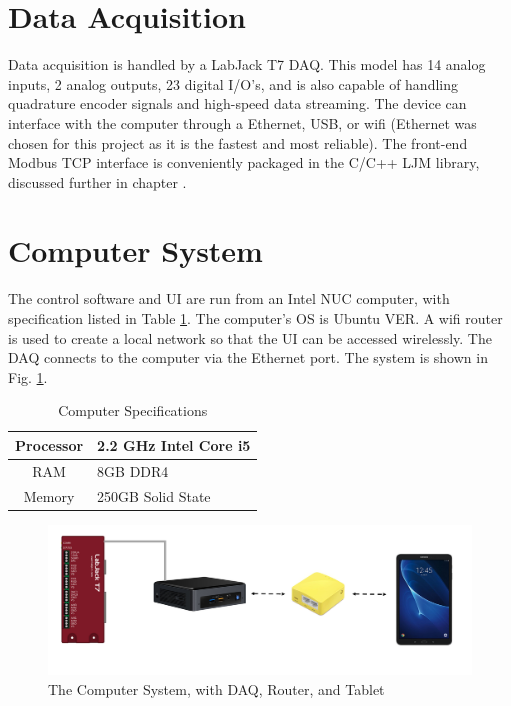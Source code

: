 \documentclass[12pt]{report}
\begin{document}
	
	\section{Data Acquisition} 

	Data acquisition is handled by a LabJack T7 DAQ. This model has 14 analog inputs, 2 analog outputs, 23 digital I/O's, and is also capable of handling quadrature encoder signals and high-speed data streaming. The device can interface with the computer through a Ethernet, USB, or wifi (Ethernet was chosen for this project as it is the fastest and most reliable). The front-end Modbus TCP interface is conveniently packaged in the C/C++ LJM library, discussed further in chapter \label{ch3}.


	\section{Computer System}

	The control software and UI are run from an Intel NUC computer, with specification listed in Table \ref{tab:comp}. The computer's OS is Ubuntu VER. A wifi router is used to create a local network so that the UI can be accessed wirelessly. The DAQ connects to the computer via the Ethernet port. The system is shown in Fig. \ref{fig:comp}. 
	

	\begin{table}[h]
	\centering
	\caption{Computer Specifications}	
	\begin{tabular}{|c|l|}
		\hline
		Processor & 2.2 GHz Intel Core i5 \\ \hline
		RAM & 8GB DDR4 \\ \hline
		Memory & 250GB Solid State \\ \hline
		\end{tabular}
	\label{tab:comp}
	\end{table}
	

	\begin{figure}[h] 
		\centering
		\includegraphics[width=0.75\linewidth]{computer_system}
		\caption{The Computer System, with DAQ, Router, and Tablet}
		\label{fig:comp}
	\end{figure}
	
\end{document}
